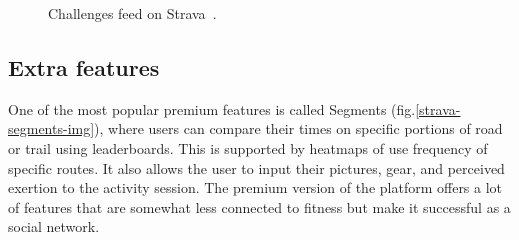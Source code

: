 \begin{figure}[h]
    \centering
    \caption{Challenges feed on Strava~\cite{strava-challenges}.}
    \label{strava-challenges}
\end{figure}

\subsection*{Extra features}
One of the most popular premium features is called Segments (fig.\ref{strava-segments-img}), where users can compare their times on specific portions of road or trail using leaderboards.
This is supported by heatmaps of use frequency of specific routes.
It also allows the user to input their pictures, gear, and perceived exertion to the activity session.
The premium version of the platform offers a lot of features that are somewhat less connected to fitness but make it successful as a social network.

